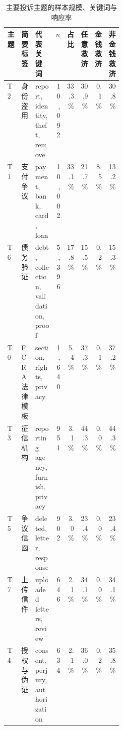 \documentclass[UTF8]{ctexart}
\begin{document}
\begin{table}[H]
  \centering
  \scriptsize
  \caption{主要投诉主题的样本规模、关键词与响应率}
  \label{tab:appendix-topic-response}
  \begin{tabular}{llp{0.27\linewidth}rrrrr}
    \toprule
    主题 & 简要标签 & 代表关键词 & \(n\) & 占比 & 任意救济 & 金钱救济 & 非金钱救济 \\
    \midrule
    T2 & 身份盗用 & report, identity, theft, remove & 10,092 & 33.3\% & 30.9\% & 0.1\% & 30.8\% \\
    T1 & 支付争议 & payment, bank, card, loan & 10,002 & 33.1\% & 21.7\% & 8.5\% & 13.2\% \\
    T6 & 债务验证 & debt, collection, validation, proof & 5,396 & 17.8\% & 15.5\% & 0.2\% & 15.3\% \\
    T0 & FCRA 法律模板 & section, rights, privacy & 1,640 & 5.4\% & 37.3\% & 0.1\% & 37.2\% \\
    T3 & 征信机构 & reporting agency, furnish, privacy & 951 & 3.1\% & 44.3\% & 0.0\% & 44.3\% \\
    T5 & 争议信函 & deleted, letter, response & 902 & 3.0\% & 23.4\% & 0.0\% & 23.4\% \\
    T7 & 上传信件 & uploaded letters, review & 646 & 2.1\% & 34.1\% & 0.0\% & 34.1\% \\
    T4 & 授权与伪证 & consent, perjury, authorization & 634 & 2.1\% & 36.0\% & 0.2\% & 35.8\% \\
    \bottomrule
  \end{tabular}
\end{table}

\begin{table}[H]
  \centering
  \scriptsize
  \caption{主要产品类别的响应结果与文本表达统计}
  \label{tab:appendix-product-response}
\end{table}
\end{document}
